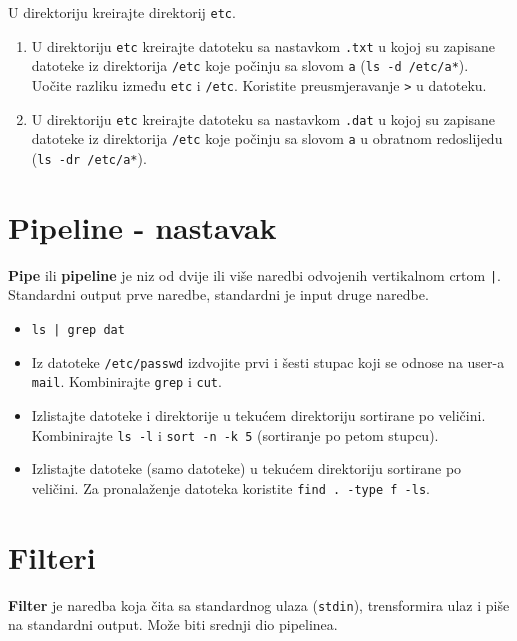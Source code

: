 \begin{zadatak} 
U direktoriju kreirajte direktorij \texttt{etc}.

\begin{enumerate}
\item U direktoriju \texttt{etc} kreirajte datoteku sa nastavkom \texttt{.txt} u kojoj su zapisane datoteke iz direktorija \texttt{/etc} koje počinju sa slovom \texttt{a} (\texttt{ls -d /etc/a*}). Uočite razliku između \texttt{etc} i \texttt{/etc}. Koristite preusmjeravanje \texttt{>} u datoteku. 
\item U direktoriju \texttt{etc} kreirajte datoteku sa nastavkom \texttt{.dat} u kojoj su zapisane datoteke iz direktorija \texttt{/etc} koje počinju sa slovom \texttt{a} u obratnom redoslijedu (\texttt{ls -dr /etc/a*}). 
\end{enumerate}
\end{zadatak}

\section*{Pipeline - nastavak}
\textbf{Pipe} ili \textbf{pipeline} je niz od dvije ili više naredbi odvojenih vertikalnom crtom \texttt{|}. Standardni output prve naredbe, standardni je input druge naredbe.
\begin{itemize}
\item \lstinline!ls | grep dat!
\item Iz datoteke \texttt{/etc/passwd} izdvojite prvi i šesti stupac koji se odnose na user-a \texttt{mail}. Kombinirajte \texttt{grep} i \texttt{cut}. 
\item Izlistajte datoteke i direktorije u tekućem direktoriju sortirane po veličini. Kombinirajte \lstinline!ls -l! i \lstinline!sort -n -k 5! (sortiranje po petom stupcu).
\item Izlistajte datoteke (samo datoteke) u tekućem direktoriju sortirane po veličini. Za pronalaženje datoteka koristite \lstinline!find . -type f -ls!.
\end{itemize}
\section*{Filteri}
\textbf{Filter} je naredba koja čita sa standardnog ulaza (\texttt{stdin}), trensformira ulaz i piše na standardni output. Može biti srednji dio pipelinea.

